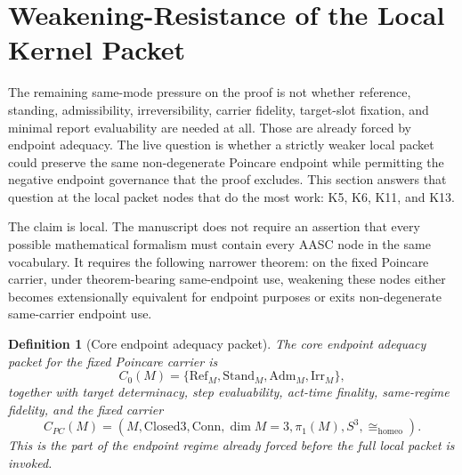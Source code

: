 \documentclass[11pt]{article}
\newtheorem{definition}[theorem]{Definition}
\newcommand{\Sthree}{S^{3}}
\newcommand{\ClosedThree}{\mathrm{Closed3}}
\newcommand{\Conn}{\mathrm{Conn}}
\newcommand{\CarrierPC}{C_{PC}}
\newcommand{\Homeo}{\cong_{\mathrm{homeo}}}
\begin{document}
\section{Weakening-Resistance of the Local Kernel Packet}\label{sec:weakening-resistance}

The remaining same-mode pressure on the proof is not whether reference, standing, admissibility, irreversibility, carrier fidelity, target-slot fixation, and minimal report evaluability are needed at all.  Those are already forced by endpoint adequacy.  The live question is whether a strictly weaker local packet could preserve the same non-degenerate Poincare endpoint while permitting the negative endpoint governance that the proof excludes.  This section answers that question at the local packet nodes that do the most work: K5, K6, K11, and K13.

The claim is local.  The manuscript does not require an assertion that every possible mathematical formalism must contain every AASC node in the same vocabulary.  It requires the following narrower theorem: on the fixed Poincare carrier, under theorem-bearing same-endpoint use, weakening these nodes either becomes extensionally equivalent for endpoint purposes or exits non-degenerate same-carrier endpoint use.

\begin{definition}[Core endpoint adequacy packet]
The core endpoint adequacy packet for the fixed Poincare carrier is
\[
C_0(M)=\{\mathrm{Ref}_M,\mathrm{Stand}_M,\mathrm{Adm}_M,\mathrm{Irr}_M\},
\]
together with target determinacy, step evaluability, act-time finality, same-regime fidelity, and the fixed carrier
\[
\CarrierPC(M)=(M,\ClosedThree,\Conn,\dim M=3,\pi_1(M),\Sthree,\Homeo).
\]
This is the part of the endpoint regime already forced before the full local packet is invoked.
\end{definition}
\end{document}
